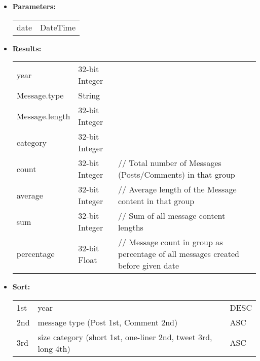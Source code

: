 {\begin{enumerate}
\begin{itemize}
                \item \textbf{Parameters:} \\
                    \begin{tabular}{ll}
                      date 										& DateTime \\
                    \end{tabular}
                \item \textbf{Results:} \\
                    \begin{tabular}{lll}
                      year 					& 32-bit Integer & \\
                      Message.type	& String & \\
                      Message.length & 32-bit Integer & \\
                      category & 32-bit Integer &   \\
                      count & 32-bit Integer &  \parbox[t]{20cm}{//  Total number of Messages (Posts/Comments) in that group  \strut} \\
                      average & 32-bit Integer &  \parbox[t]{20cm}{// Average length of the Message content in that group \strut} \\
                      sum & 32-bit Integer &  \parbox[t]{20cm}{// Sum of all message content lengths  \strut} \\
                      percentage & 32-bit Float &  \parbox[t]{20cm}{// Message count in group as percentage of all messages created before given date\strut} \\
                      \end{tabular}

                  \item \textbf{Sort:} \\
                      \begin{tabular}{lll}
                      1st & year & DESC \\
                      2nd & message type (Post 1st, Comment 2nd) & ASC\\
                      3rd & size category (short 1st, one-liner 2nd, tweet 3rd, long 4th) & ASC\\
                      \end{tabular}
                    \end{itemize}


\end{enumerate}}
